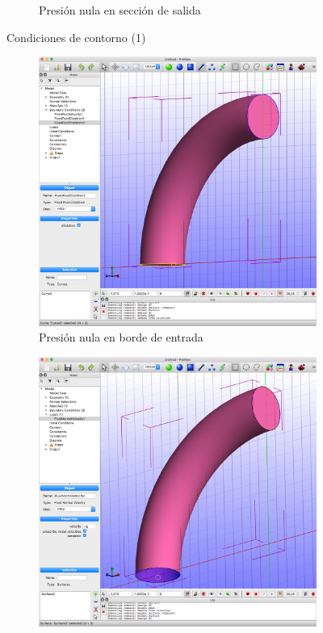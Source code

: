 \begin{figure}[!ht]
\begin{subfigure}[b]{0.48\textwidth}
\caption{Presión nula en sección de salida}
\label{fig:06_bc_zfd1b}
\end{subfigure}
\caption{Condiciones de contorno (1)}
\label{fig:qtor-cc1}
\end{figure}

\begin{figure}[!ht]
\centering
\begin{subfigure}[b]{0.48\textwidth}
\centering
\includegraphics[width=\linewidth]{figuras_4/06_bc_zfd2.png}
\caption{Presión nula en borde de entrada}
\label{fig:06_bc_zfd2}
\end{subfigure}
\hfil
\begin{subfigure}[b]{0.48\textwidth}
\includegraphics[width=\linewidth]{figuras_4/07_load-fnv-2.png}

\end{subfigure}
\end{figure}
